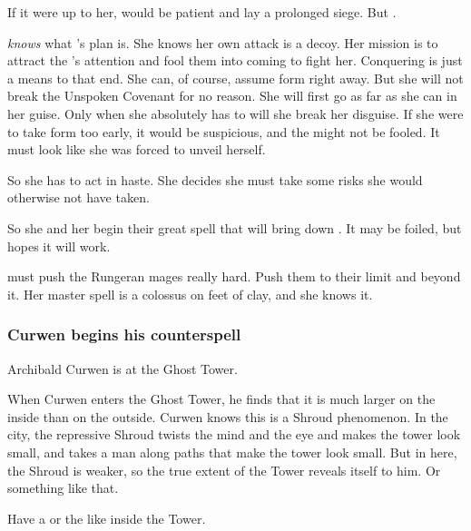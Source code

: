 If it were up to her, \Takestsha would be patient and lay a prolonged siege. 
But . 

\Takestsha \emph{knows} what \Secherdamon's plan is.
She knows her own attack is a decoy.
Her mission is to attract the \resphain's attention and fool them into coming to fight her. 
Conquering \Forclin is just a means to that end. 
She can, of course, assume \draconian form right away.
But she will not break the Unspoken Covenant for no reason.
She will first go as far as she can in her \human guise.
Only when she absolutely has to will she break her disguise.
If she were to take \draconian form too early, it would be suspicious, and the \resphain might not be fooled. 
It must look like she was forced to unveil herself. 

So she has to act in haste. 
She decides she must take some risks she would otherwise not have taken. 

So she and her \ishrah begin their great spell that will bring down \Forclin. 
It may be foiled, but \Takestsha hopes it will work. 

\Takestsha must push the Rungeran mages really hard. 
Push them to their limit and beyond it. 
Her master spell is a colossus on feet of clay, and she knows it. 





\subsubsection{Curwen begins his counterspell}
Archibald Curwen is at the Ghost Tower. 

When Curwen enters the Ghost Tower, he finds that it is much larger on the inside than on the outside.
Curwen knows this is a Shroud phenomenon.
In the city, the repressive Shroud twists the mind and the eye and makes the tower look small, and takes a man along paths that make the tower look small.
But in here, the Shroud is weaker, so the true extent of the Tower reveals itself to him.
Or something like that.

Have a  or the like inside the Tower. 


